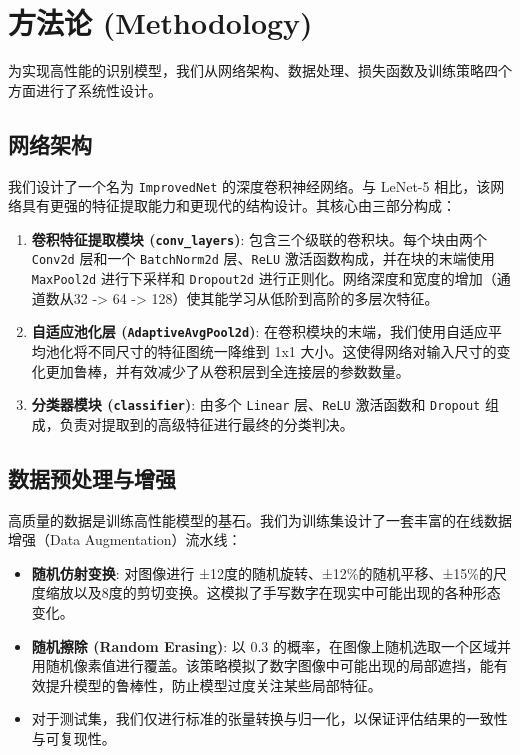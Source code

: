 \documentclass[UTF8]{ctexart}
\begin{document}
\section{方法论 (Methodology)}

为实现高性能的识别模型，我们从网络架构、数据处理、损失函数及训练策略四个方面进行了系统性设计。

\subsection{网络架构}

我们设计了一个名为 \texttt{ImprovedNet} 的深度卷积神经网络。与 LeNet-5 相比，该网络具有更强的特征提取能力和更现代的结构设计。其核心由三部分构成：

\begin{enumerate}
    \item \textbf{卷积特征提取模块 (\texttt{conv\_layers})}: 包含三个级联的卷积块。每个块由两个 \texttt{Conv2d} 层和一个 \texttt{BatchNorm2d} 层、\texttt{ReLU} 激活函数构成，并在块的末端使用 \texttt{MaxPool2d} 进行下采样和 \texttt{Dropout2d} 进行正则化。网络深度和宽度的增加（通道数从32 -> 64 -> 128）使其能学习从低阶到高阶的多层次特征。
    \item \textbf{自适应池化层 (\texttt{AdaptiveAvgPool2d})}: 在卷积模块的末端，我们使用自适应平均池化将不同尺寸的特征图统一降维到 1x1 大小。这使得网络对输入尺寸的变化更加鲁棒，并有效减少了从卷积层到全连接层的参数数量。
    \item \textbf{分类器模块 (\texttt{classifier})}: 由多个 \texttt{Linear} 层、\texttt{ReLU} 激活函数和 \texttt{Dropout} 组成，负责对提取到的高级特征进行最终的分类判决。
\end{enumerate}

\subsection{数据预处理与增强}

高质量的数据是训练高性能模型的基石。我们为训练集设计了一套丰富的在线数据增强（Data Augmentation）流水线：

\begin{itemize}
    \item \textbf{随机仿射变换}: 对图像进行 ±12度的随机旋转、±12\%的随机平移、±15\%的尺度缩放以及8度的剪切变换。这模拟了手写数字在现实中可能出现的各种形态变化。
    \item \textbf{随机擦除 (Random Erasing)}: 以 0.3 的概率，在图像上随机选取一个区域并用随机像素值进行覆盖。该策略模拟了数字图像中可能出现的局部遮挡，能有效提升模型的鲁棒性，防止模型过度关注某些局部特征。
    \item 对于测试集，我们仅进行标准的张量转换与归一化，以保证评估结果的一致性与可复现性。
\end{itemize}
\end{document}
